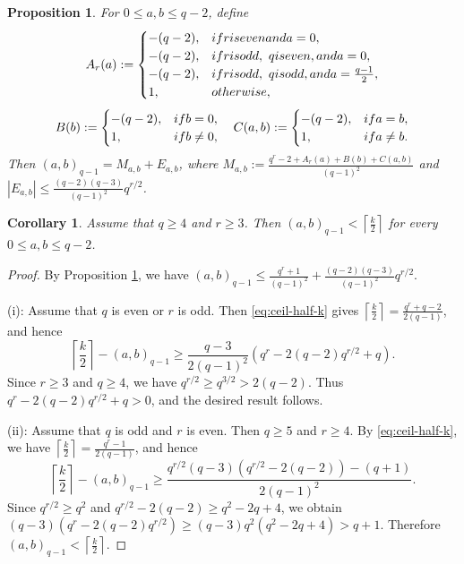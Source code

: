 \documentclass[10pt,a4paper]{amsart}
\newtheorem{prop}{Proposition}
\newtheorem{cor}{Corollary}
\begin{document}
\begin{prop}\label{prop:main-term-explicit-general}
For $0\le a,b\le q-2$, define
\[
  A_r(a):=
  \begin{cases}
    -(q-2), & \textup{if } r \textup{ is even and } a=0,\\
    -(q-2), & \textup{if } r \textup{ is odd},\ q \textup{ is even, and } a=0,\\
    -(q-2), & \textup{if } r \textup{ is odd},\ q \textup{ is odd, and } a=\frac{q-1}{2},\\
    1, & \textup{otherwise,}
  \end{cases}\]
  \[
  B(b):=
  \begin{cases}
    -(q-2), & \textup{if } b=0,\\
    1, & \textup{if } b\neq 0,
  \end{cases}\quad
  C(a,b):=
  \begin{cases}
    -(q-2), & \textup{if } a=b,\\
    1, & \textup{if } a\neq b.
  \end{cases}
\]
Then
$(a,b)_{q-1}=M_{a,b}+E_{a,b}$,
where
$M_{a,b}:=\frac{q^r-2+A_r(a)+B(b)+C(a,b)}{(q-1)^2}$
and
$|E_{a,b}|\le \frac{(q-2)(q-3)}{(q-1)^2}q^{r/2}$.
\end{prop}

\begin{cor}\label{cor:character-sum-half-k-qgefour-rgeqthree}
Assume that $q\ge4$ and $r\ge3$. Then $(a,b)_{q-1}< \left\lceil \frac{k}{2}\right\rceil$ for every $0\le a,b\le q-2$.
\end{cor}

\begin{proof}
By Proposition \ref{prop:main-term-explicit-general}, we have
$(a,b)_{q-1}\le \frac{q^r+1}{(q-1)^2}+\frac{(q-2)(q-3)}{(q-1)^2}q^{r/2}$.

\noindent(i): Assume that $q$ is even or $r$ is odd. Then \eqref{eq:ceil-half-k} gives $\left\lceil \frac{k}{2}\right\rceil=\frac{q^r+q-2}{2(q-1)}$, and hence
\[
\left\lceil \frac{k}{2}\right\rceil-(a,b)_{q-1}
\ge
\frac{q-3}{2(q-1)^2}\left(q^r-2(q-2)q^{r/2}+q\right).
\]
Since $r\ge3$ and $q\ge4$, we have $q^{r/2}\ge q^{3/2}>2(q-2)$. Thus $q^r-2(q-2)q^{r/2}+q>0$, and the desired result follows.

\noindent(ii): Assume that $q$ is odd and $r$ is even. Then $q\ge5$ and $r\ge4$. By \eqref{eq:ceil-half-k}, we have $\left\lceil \frac{k}{2}\right\rceil=\frac{q^r-1}{2(q-1)}$, and hence
\[
\left\lceil \frac{k}{2}\right\rceil-(a,b)_{q-1}
\ge
\frac{q^{r/2}(q-3)\left(q^{r/2}-2(q-2)\right)-(q+1)}{2(q-1)^2}.
\]
Since $q^{r/2}\ge q^2$ and $q^{r/2}-2(q-2)\ge q^2-2q+4$, we obtain
$(q-3)\left(q^r-2(q-2)q^{r/2}\right)\ge (q-3)q^2(q^2-2q+4)>q+1$.
Therefore $(a,b)_{q-1}< \left\lceil \frac{k}{2}\right\rceil$.
\end{proof}
\end{document}
